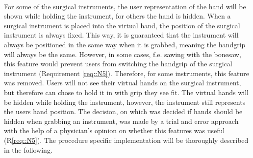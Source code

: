 \\ For some of the surgical instruments, the user representation of the hand will be shown while holding the instrument, for others the hand is hidden.
When a surgical instrument is placed into the virtual hand, the position of the surgical instrument is always fixed.
This way, it is guaranteed that the instrument will always be positioned in the same way when it is grabbed, meaning the handgrip will always be the same.
However, in some cases, f.e. sawing with the bonesaw, this feature would prevent users from switching the handgrip of the surgical instrument (Requirement \ref{req::N5}). 
Therefore, for some instruments, this feature was removed.
Users will not see their virtual hands on the surgical instrument, but therefore can chose to hold it in with grip they see fit.
The virtual hands will be hidden while holding the instrument, however, the instrument still represents the users hand position.
The decision, on which was decided if hands should be hidden when grabbing an instrument, was made by a trial and error approach with the help of a physician's opinion on whether this features was useful (R\ref{req::N5}).
The procedure specific implementation will be thoroughly described in the following.






